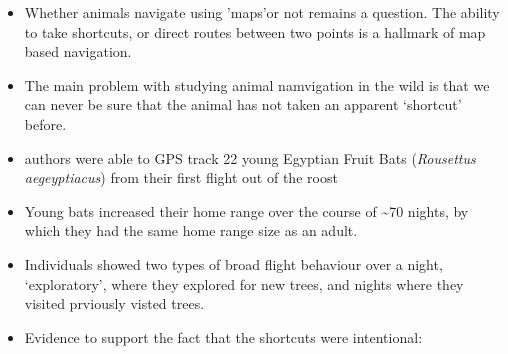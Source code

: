 \documentclass[
]{book}
\providecommand{\tightlist}{%
  \setlength{\itemsep}{0pt}\setlength{\parskip}{0pt}}
\begin{document}
\begin{itemize}
\tightlist
\item
  Whether animals navigate using 'maps'or not remains a question. The ability to take shortcuts, or direct routes between two points is a hallmark of map based navigation.
\item
  The main problem with studying animal namvigation in the wild is that we can never be sure that the animal has not taken an apparent `shortcut' before.
\item
  authors were able to GPS track 22 young Egyptian Fruit Bats (\emph{Rousettus aegeyptiacus}) from their first flight out of the roost
\item
  Young bats increased their home range over the course of \textasciitilde70 nights, by which they had the same home range size as an adult.
\item
  Individuals showed two types of broad flight behaviour over a night, `exploratory', where they explored for new trees, and nights where they visited prviously visted trees.
\item
  Evidence to support the fact that the shortcuts were intentional:


\end{itemize}
\end{document}
